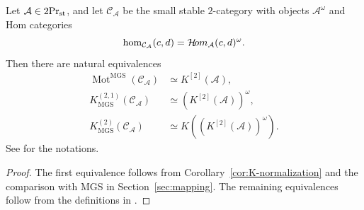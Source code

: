 \begin{corollary}\label{cor:general-MGS}
Let $\mathcal A\in{2}\mathrm{Pr}_{\mathrm{st}}$, and let
$\mathcal C_{\mathcal A}$ be the small stable
$2$-category with objects $\mathcal A^\omega$
and Hom categories
\[
 \operatorname{hom}_{\mathcal C_{\mathcal A}}(c,d)
 =\mathcal{H}\!om_{\mathcal A}(c,d)^\omega.
\]
Then there are natural equivalences
\[
 \begin{aligned}
 \operatorname{Mot}^{\mathrm{MGS}}
       (\mathcal C_{\mathcal A})
   &\simeq  K^{[2]}(\mathcal A)
     ,\\
 K^{(2,1)}_{\mathrm{MGS}}
       (\mathcal C_{\mathcal A})
   &\simeq (K^{[2]}(\mathcal A))^\omega,\\
 K^{(2)}_{\mathrm{MGS}}
       (\mathcal C_{\mathcal A})
   &\simeq K((K^{[2]}(\mathcal A))^\omega).
 \end{aligned}
\]
See \cite{MGS} for the notations.
\end{corollary}

\begin{proof}
The first equivalence follows from
Corollary~\ref{cor:K-normalization}
and the comparison with MGS in
Section~\ref{sec:mapping}.
The remaining equivalences follow
from the definitions in \citep{MGS}.
\end{proof}



